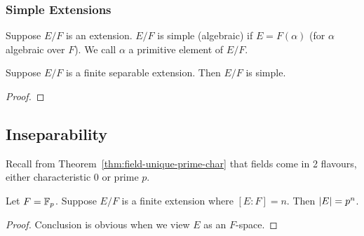 \subsubsection*{Simple Extensions}

\begin{definition}
    Suppose \(E/F\) is an extension.
    \(E/F\) is simple (algebraic)
    if \(E = F(\alpha)\) (for \(\alpha\) algebraic over \(F\)).
    We call \(\alpha\) a primitive element of \(E/F\).
\end{definition}
\begin{theorem}\label{thm:primitive-element}
    Suppose \(E/F\) is a finite separable extension.
    Then \(E/F\) is simple.
\end{theorem}
\begin{proof}
\end{proof}


\subsection{Inseparability}

\begin{remark}
    Recall from Theorem~\ref{thm:field-unique-prime-char}
    that fields come in 2 flavours,
    either characteristic 0 or prime \(p\).
\end{remark}

\begin{proposition}\label{prop:finite-extension-finite-field}
    Let \(F = \mathbb{F}_p\).
    Suppose \(E/F\) is a finite extension where \([E:F] = n\).
    Then \(\abs{E} = p^n\).
\end{proposition}
\begin{proof}
    Conclusion is obvious when we view \(E\) as an \(F\)-space.
\end{proof}

